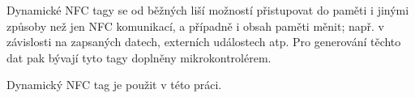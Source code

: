     Dynamické NFC tagy se od běžných liší možností přistupovat do paměti i 
    jinými způsoby než jen NFC komunikací, a případně i obsah paměti měnit;
    např. v závislosti na zapsaných datech, externích událostech atp.
    Pro generování těchto dat pak bývají tyto tagy doplněny mikrokontrolérem.

    Dynamický NFC tag je použit v této práci.

